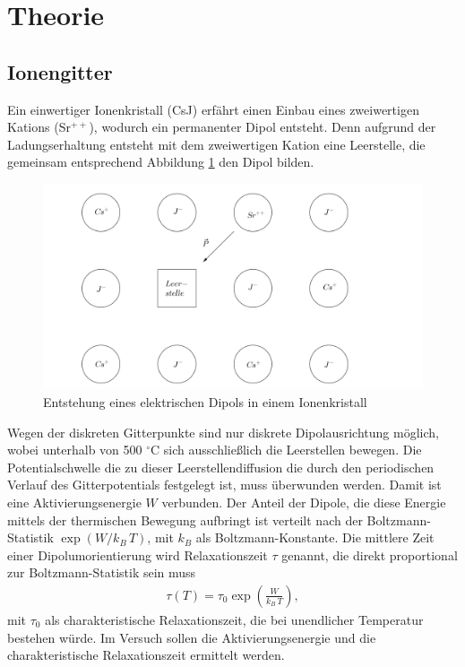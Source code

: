 

\section{Theorie}
\setcounter{page}{1}
\subsection{Ionengitter}
Ein einwertiger Ionenkristall (CsJ) erfährt einen Einbau eines zweiwertigen Kations (Sr$^{++}$), wodurch ein permanenter Dipol entsteht. Denn aufgrund
der Ladungserhaltung entsteht mit dem zweiwertigen Kation eine Leerstelle, die gemeinsam entsprechend Abbildung \ref{pic_dipGitt} den Dipol bilden.
\begin{figure}[H]
\includegraphics[width=\textwidth]{../pics/dipGitt.png}
\caption{Entstehung eines elektrischen Dipols in einem Ionenkristall}
\label{pic_dipGitt}
\end{figure}
Wegen der diskreten Gitterpunkte sind nur diskrete Dipolausrichtung möglich, wobei unterhalb von 500 $^\circ$C sich ausschließlich die Leerstellen bewegen.
Die Potentialschwelle die zu dieser Leerstellendiffusion die durch den periodischen Verlauf des Gitterpotentials festgelegt ist, muss überwunden werden.
Damit ist eine Aktivierungsenergie $W$ verbunden. Der Anteil der Dipole, die diese Energie mittels der thermischen Bewegung aufbringt ist
verteilt nach der Boltzmann-Statistik $\exp(W/k_B\,T)$, mit $k_B$ als Boltzmann-Konstante. Die mittlere Zeit einer Dipolumorientierung wird Relaxationszeit
$\tau$ genannt, die direkt proportional zur Boltzmann-Statistik sein muss
\begin{align}
 \tau(T) = \tau_0 \exp\left(\frac{W}{k_B\, T}\right),
 \label{eq_tau(W)}
\end{align}
mit $\tau_0$ als charakteristische Relaxationszeit, die bei unendlicher Temperatur bestehen würde. Im Versuch sollen die Aktivierungsenergie und die
charakteristische Relaxationszeit ermittelt werden.

